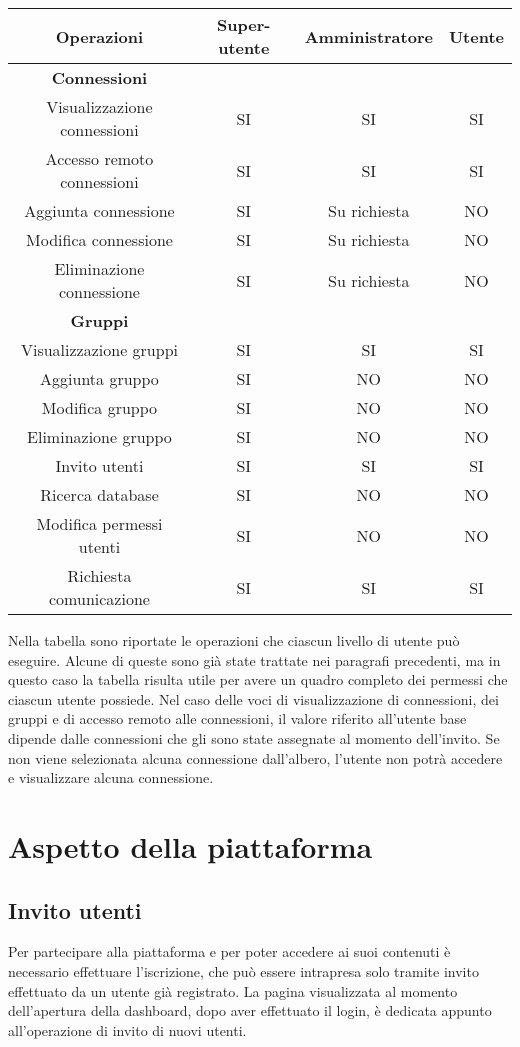\begin{center}
\begin{tabular}{c c c c}
\textbf{Operazioni} & \textbf{Super-utente} & \textbf{Amministratore} & \textbf{Utente}\\
\midrule
\textbf{Connessioni}\\
Visualizzazione connessioni & SI & SI & SI\\
Accesso remoto connessioni & SI & SI & SI\\
Aggiunta connessione & SI & Su richiesta & NO\\
Modifica connessione & SI & Su richiesta & NO\\
Eliminazione connessione & SI & Su richiesta & NO\\
\midrule
\textbf{Gruppi}\\
Visualizzazione gruppi & SI & SI & SI\\
Aggiunta gruppo & SI & NO & NO\\
Modifica gruppo & SI & NO & NO\\
Eliminazione gruppo & SI & NO & NO\\
\midrule
Invito utenti & SI & SI & SI\\
Ricerca database & SI & NO & NO\\
Modifica permessi utenti & SI & NO & NO\\
Richiesta comunicazione  & SI & SI & SI
\end{tabular}
\end{center}

Nella tabella sono riportate le operazioni che ciascun livello di utente può eseguire. Alcune di queste sono già state trattate nei paragrafi precedenti, ma in questo caso la tabella risulta utile per avere un quadro completo dei permessi che ciascun utente possiede.
Nel caso delle voci di visualizzazione di connessioni, dei gruppi e di accesso remoto alle connessioni, il valore riferito all'utente base dipende dalle connessioni che gli sono state assegnate al momento dell'invito. Se non viene selezionata alcuna connessione dall'albero, l'utente non potrà accedere e visualizzare alcuna connessione.

\section{Aspetto della piattaforma}
\label{sec:aspetto della piattaforma}

\subsection{Invito utenti}
\label{sec:invito utenti}
Per partecipare alla piattaforma e per poter accedere ai suoi contenuti è necessario effettuare l’iscrizione, che può essere intrapresa solo tramite invito effettuato da un utente già registrato.
La pagina visualizzata al momento dell'apertura della dashboard, dopo aver effettuato il login, è dedicata appunto all'operazione di invito di nuovi utenti. 

